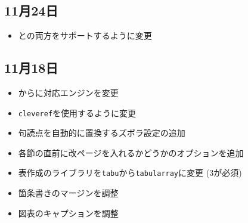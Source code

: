 \subsection*{11月24日}

\begin{itemize}
  \item \xelatex と\lualatex の両方をサポートするように変更
\end{itemize}

\subsection*{11月18日}

\begin{itemize}
  \item \xelatex から\lualatex に対応エンジンを変更
  \item \texttt{cleveref}を使用するように変更
  \item 句読点を自動的に置換するズボラ設定の追加
  \item 各節の直前に改ページを入れるかどうかのオプションを追加
  \item 表作成のライブラリを\texttt{tabu}から\texttt{tabularray}に変更 (\latex 3が必須)
  \item 箇条書きのマージンを調整
  \item 図表のキャプションを調整
\end{itemize}
